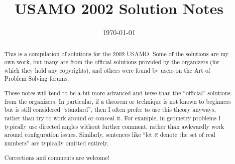 \documentclass[11pt]{scrartcl}
\title{USAMO 2002 Solution Notes}
\date{\today}
\begin{document}
\maketitle

\begin{abstract}
This is a compilation of solutions
for the 2002 USAMO.
Some of the solutions are my own work,
but many are from the official solutions provided by the organizers
(for which they hold any copyrights),
and others were found by users on the Art of Problem Solving forums.

These notes will tend to be a bit more advanced and terse than the ``official''
solutions from the organizers.
In particular, if a theorem or technique is not known to beginners
but is still considered ``standard'', then I often prefer to
use this theory anyways, rather than try to work around or conceal it.
For example, in geometry problems I typically use directed angles
without further comment, rather than awkwardly work around configuration issues.
Similarly, sentences like ``let $\mathbb{R}$ denote the set of real numbers''
are typically omitted entirely.

Corrections and comments are welcome!
\end{abstract}

\tableofcontents
\newpage

\addtocounter{section}{-1}
\end{document}
